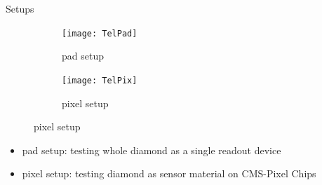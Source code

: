 \begin{frame}{Setups}
	\begin{figure} 
		\begin{center}
			\begin{subfigure}{0.45\textwidth}  
				\centering 
				\texttt{[image: TelPad]}
				\caption{pad setup}
			\end{subfigure}
			\begin{subfigure}{0.45\textwidth} 
				\centering 
				\texttt{[image: TelPix]}
				\caption{pixel setup} 	
			\end{subfigure} 
		\end{center}
	\end{figure}
	\vspace*{10pt}
	\begin{itemize}
		\item pad setup: testing whole diamond as a single readout device
		\item pixel setup: testing diamond as sensor material on CMS-Pixel Chips
	\end{itemize}
\end{frame}

